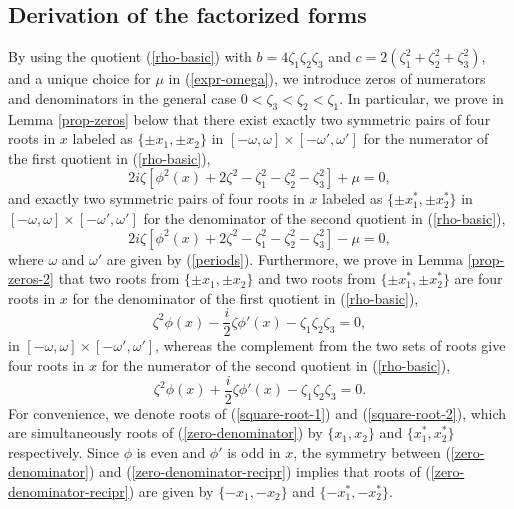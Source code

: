 \documentclass[12pt,reqno]{amsart}
\numberwithin{equation}{section}
\begin{document}
\subsection{Derivation of the factorized forms}
\label{sec-5-0}

By using the quotient (\ref{rho-basic}) with $b = 4 \zeta_1 \zeta_2 \zeta_3$ and 
$c = 2 (\zeta_1^2 + \zeta_2^2 + \zeta_3^2)$, and a unique choice for $\mu$ in (\ref{expr-omega}), we introduce zeros of numerators and denominators 
in the general case $0 < \zeta_3 < \zeta_2 < \zeta_1$. In particular, we prove in Lemma \ref{prop-zeros} below 
that there exist exactly two symmetric  pairs of four roots in $x$ labeled as 
$\{ \pm x_1, \pm x_2\}$ in $[-\omega,\omega] \times [-\omega',\omega']$ 
for the numerator of the first quotient in (\ref{rho-basic}),
\begin{equation}
\label{square-root-1}
2 i \zeta \left[ \phi^2(x) + 2 \zeta^2 - \zeta_1^2 - \zeta_2^2 - \zeta_3^2 \right] + \mu = 0,
\end{equation}
and exactly two symmetric  pairs of four roots in $x$ labeled as 
$\{ \pm x_1^*, \pm x_2^*\}$ in $[-\omega,\omega] \times [-\omega',\omega']$ 
for the denominator of the second quotient in (\ref{rho-basic}),
\begin{equation}
\label{square-root-2}
2 i \zeta \left[ \phi^2(x) + 2 \zeta^2 - \zeta_1^2 - \zeta_2^2 - \zeta_3^2 \right] - \mu = 0,
\end{equation}
where $\omega$ and $\omega'$ are given by (\ref{periods}).
Furthermore, we prove in Lemma \ref{prop-zeros-2} that two roots from $\{ \pm x_1, \pm x_2\}$ and two roots from $\{ \pm x_1^*, \pm x_2^*\}$ are 
four roots in $x$ for the denominator of the first quotient in (\ref{rho-basic}),
\begin{equation}
\label{zero-denominator}
\zeta^2 \phi(x) - \frac{i}{2} \zeta \phi'(x) - \zeta_1 \zeta_2 \zeta_3 = 0,
\end{equation}
in $[-\omega,\omega] \times [-\omega',\omega']$, whereas the complement from the two sets of roots give four roots in $x$ for the numerator of the second quotient in (\ref{rho-basic}),
\begin{equation}
\label{zero-denominator-recipr}
\zeta^2 \phi(x) + \frac{i}{2} \zeta \phi'(x) - \zeta_1 \zeta_2 \zeta_3 = 0.
\end{equation}
For convenience, we denote roots of (\ref{square-root-1}) and (\ref{square-root-2}), which are simultaneously roots of (\ref{zero-denominator}) by $\{x_1,x_2 \}$ and $\{ x_1^*,x_2^*\}$ respectively. Since $\phi$ is even and $\phi'$ is odd in $x$, the symmetry between (\ref{zero-denominator}) and (\ref{zero-denominator-recipr}) implies that 
roots of (\ref{zero-denominator-recipr}) are given by $\{-x_1,-x_2 \}$ and $\{ -x_1^*,-x_2^*\}$.
\end{document}
